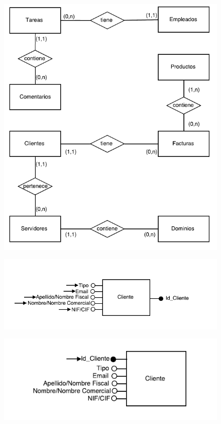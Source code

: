 \documentclass[paper=a4, fontsize=11pt, spanish]{scrartcl}
\begin{document}
\begin{figure}
	\includegraphics[width=1.20\textwidth]{PlanoFinal.png}
	\caption{}
	\label{fig:PlanoFinal}
\end{figure}

\begin{figure}
	\includegraphics[width=1.20\textwidth]{NavCrear.png}
	\caption{}
	\label{fig:NavCrear}
\end{figure}

\begin{figure}
	\includegraphics[width=1.20\textwidth]{NavConsultar.png}
	\caption{}
	\label{fig:NavConsultar}
\end{figure}
\end{document}
